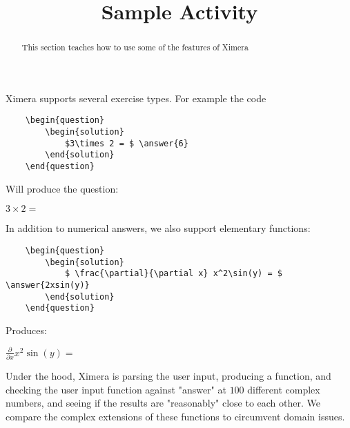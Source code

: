 \documentclass{ximera}
\begin{document}
	\title{Sample Activity}
	\begin{abstract}
		This section teaches how to use some of the features of Ximera
	\end{abstract}
	
	Ximera supports several exercise types.  For example the code
	
\begin{verbatim}
    \begin{question}
        \begin{solution}
            $3\times 2 = $ \answer{6}
        \end{solution}
    \end{question}
\end{verbatim}

Will produce the question:

\begin{question}
        \begin{solution}
            $3\times 2 = $ 
        \end{solution}
\end{question}

In addition to numerical answers, we also support elementary functions:

\begin{verbatim}
    \begin{question}
        \begin{solution}
            $ \frac{\partial}{\partial x} x^2\sin(y) = $ \answer{2xsin(y)}
        \end{solution}
    \end{question}
\end{verbatim}

Produces:

  \begin{question}
        \begin{solution}
            $ \frac{\partial}{\partial x} x^2\sin(y) = $ 
        \end{solution}
    \end{question}
    
Under the hood, Ximera is parsing the user input, producing a function, and checking the user input function against "answer" at 
$100$ different complex numbers, and seeing if the results are "reasonably" close to each other.  
We compare the complex extensions of these functions to circumvent domain issues.




	
	
\end{document}
